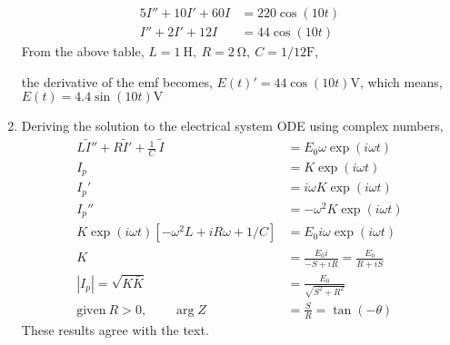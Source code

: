 \begin{enumerate}
          \begin{align}
              5I'' + 10I' + 60I & = 220 \cos(10t) \\
              I'' + 2I' + 12I   & = 44 \cos(10t)
          \end{align}
          From the above table, $ L = \SI{1}{\henry},
              \  R = \SI{2}{\ohm},\ C = 1/12 \unit{\farad}$, \par
          the derivative of the emf becomes, $ E(t)' = 44 \cos(10t) \unit{\volt} $,
          which means, $ E(t) =  4.4\sin(10t) \unit{\volt}$

    \item Deriving the solution to the electrical system ODE using complex numbers,
          \begin{align}
              L\tilde{I}'' +  R \tilde{I}' + \frac{1}{C}\ \tilde{I}
                                                 & = E_{0}\omega \exp(i\omega t)  \\
              I_{p}                              & = K\exp(i\omega t)             \\
              I_{p}'                             & = i\omega K\exp(i\omega t)     \\
              I_{p}''                            & = -\omega^{2}K\exp(i\omega t)  \\
              K\exp(i\omega t) [-\omega^{2}L + iR\omega + 1/C]
                                                 & = E_{0}i\omega \exp(i\omega t) \\
              K                                  & = \frac{E_{0}i}{-S + iR}
              = \frac{E_{0}}{R + iS}                                              \\
              |I_{p}| = \sqrt{K \bar{K}}         & = \frac{E_{0}}{\sqrt{S^{2}
              + R^{2}}}                                                           \\
              \text{given}\ R > 0, \qquad \arg Z & = \frac{S}{R} = \tan(-\theta)
          \end{align}
          These results agree with the text.
\end{enumerate}